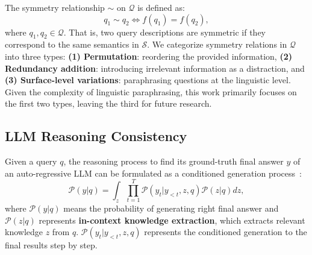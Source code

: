 The symmetry relationship \( \sim \) on \( \mathcal{Q} \) is defined as:
\begin{equation}
    q_1 \sim q_2 \iff f(q_1) = f(q_2),
\end{equation}
where \( q_1, q_2 \in \mathcal{Q} \). That is, two query descriptions are symmetric if they correspond to the same semantics in \( \mathcal{S} \). 
We categorize symmetry relations in \( \mathcal{Q} \) into three types: \textbf{(1) Permutation}: reordering the provided information, \textbf{(2) Redundancy addition}: introducing irrelevant information as a distraction, and \textbf{(3) Surface-level variations}: paraphrasing questions at the linguistic level. Given the complexity of linguistic paraphrasing, this work primarily focuses on the first two types, leaving the third for future research.

\subsection{LLM Reasoning Consistency}
\label{subsection: LLM Reasoning Equivalence}
Given a query $q$, the reasoning process to find its ground-truth final answer $y$ of an auto-regressive LLM can be formulated as a conditioned generation process~\citep{xiang2025towards}:
\begin{equation}
\label{eq:math_format reasoning}
    \mathcal{P}(y | q) = \int_z \prod_{t=1}^T \mathcal{P}(y_t | y_{<t}, z, q) \mathcal{P}(z | q) dz,
\end{equation}
where \( \mathcal{P}(y | q) \) means the probability of generating right final answer and \( \mathcal{P}(z | q) \) represents \textbf{in-context knowledge extraction}, which extracts relevant knowledge \( z \) from \( q \). \( \mathcal{P}(y_t | y_{<t}, z, q) \) represents the conditioned generation to the final results step by step. 

